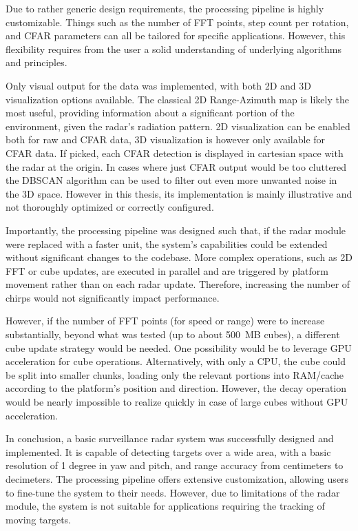 Due to rather generic design requirements, the processing pipeline is highly customizable.
Things such as the number of FFT points, step count per rotation, and CFAR parameters can all be tailored for specific applications.
However, this flexibility requires from the user a solid understanding of underlying algorithms and principles.

Only visual output for the data was implemented, with both 2D and 3D visualization options available.
The classical 2D Range-Azimuth map is likely the most useful, providing information about a significant portion of the environment, given the radar’s radiation pattern.
2D visualization can be enabled both for raw and CFAR data, 3D visualization is however only available for CFAR data.
If picked, each CFAR detection is displayed in cartesian space with the radar at the origin.
In cases where just CFAR output would be too cluttered the DBSCAN algorithm can be used to filter out even more unwanted noise in the 3D space.
However in this thesis, its implementation is mainly illustrative and not thoroughly optimized or correctly configured.

Importantly, the processing pipeline was designed such that, if the radar module were replaced with a faster unit, the system’s capabilities could be extended without significant changes to the codebase.
More complex operations, such as 2D FFT or cube updates, are executed in parallel and are triggered by platform movement rather than on each radar update.
Therefore, increasing the number of chirps would not significantly impact performance.

However, if the number of FFT points (for speed or range) were to increase substantially, beyond what was tested (up to about 500~MB cubes), a different cube update strategy would be needed.
One possibility would be to leverage GPU acceleration for cube operations.
Alternatively, with only a CPU, the cube could be split into smaller chunks, loading only the relevant portions into RAM/cache according to the platform’s position and direction.
However, the decay operation would be nearly impossible to realize quickly in case of large cubes without GPU acceleration.

In conclusion, a basic surveillance radar system was successfully designed and implemented.
It is capable of detecting targets over a wide area, with a basic resolution of 1 degree in yaw and pitch, and range accuracy from centimeters to decimeters.
The processing pipeline offers extensive customization, allowing users to fine-tune the system to their needs.
However, due to limitations of the radar module, the system is not suitable for applications requiring the tracking of moving targets.
